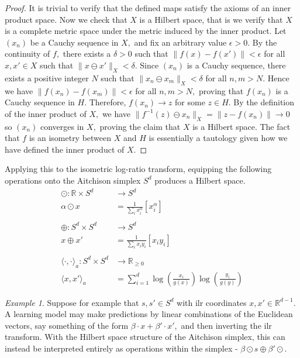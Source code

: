 \documentclass[BSc]{usydthesis}
\numberwithin{equation}{chapter}
\theoremstyle{remark}
\newtheorem{Example}[equation]{Example}
\begin{document}
\begin{proof}
 It is trivial to verify that the defined maps satisfy the axioms of an inner product space. Now we check that $X$ is a Hilbert space, that is we verify that $X$ is a complete metric space under the metric induced by the inner product. Let $(x_n)$ be a Cauchy sequence in $X,$ and fix an arbitrary value $\epsilon > 0.$ By the continuity of $f,$ there exists a $\delta>0$ such that $\| f(x) - f(x') \| < \epsilon$ for all $x, x' \in X$ such that $\| x\ominus x'\|_X < \delta.$ Since $(x_n)$ is a Cauchy sequence, there exists a positive integer $N$ such that $\| x_n \ominus x_m \|_X < \delta$ for all $n,m > N.$ Hence we have $\| f(x_n) - f(x_m) \| < \epsilon$ for all $n,m > N,$ proving that $f(x_n)$ is a Cauchy sequence in $H.$ Therefore, $f(x_n) \to z$ for some $z\in H.$ By the definition of the inner product of $X,$ we have $\| f^{-1}(z) \ominus x_n \|_X = \| z - f(x_n) \| \to 0$ so $(x_n)$ converges in $X,$ proving the claim that $X$ is a Hilbert space. The fact that $f$ is an isometry between $X$ and $H$ is essentially a tautology given how we have defined the inner product of $X.$
\end{proof}

Applying this to the isometric log-ratio transform, equipping the following operations onto the Aitchison simplex $S^d$ produces a Hilbert space.  
\begin{align*}
 \odot : \mathbb{R} \times S^d &\to S^d \\
    \alpha \odot x &= \frac{1}{\sum_{i} x_i^{\alpha}} [x_i^{\alpha}] \\
    \ \\
 \oplus : S^d \times S^d &\to S^d \\
    x \oplus x' &= \frac{1}{\sum_i x_i y_i} [x_i y_i] \\
    \ \\
 \langle \cdot, \cdot \rangle_a : S^d \times S^d &\to \mathbb{R}_{\geq 0} \\
    \langle x, x' \rangle_a &= \sum_{i=1}^d \log \left( \frac{x_i}{g(x)} \right)\log \left( \frac{y_i}{g(y)} \right)
\end{align*}

\begin{Example}
Suppose for example that $s, s' \in S^d$ with ilr coordinates $x, x' \in \mathbb{R}^{d-1}.$ A learning model may make predictions by linear combinations of the Euclidean vectors, say something of the form $\beta \cdot x + \beta' \cdot x',$ and then inverting the ilr transform. With the Hilbert space structure of the Aitchison simplex, this can instead be interpreted entirely as operations within the simplex - $\beta \odot s \oplus \beta' \odot.$ 
\end{Example}
\end{document}
